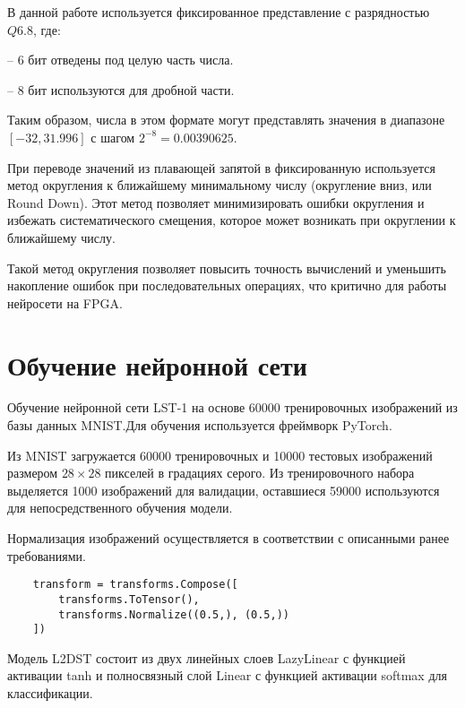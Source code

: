 В данной работе используется фиксированное представление с разрядностью $Q6.8$,
где:

  – 6 бит отведены под целую часть числа.

  – 8 бит используются для дробной части.

Таким образом, числа в этом формате могут представлять значения в диапазоне 
$[-32, 31.996]$ с шагом $2^{-8} = 0.00390625$.

При переводе значений из плавающей запятой в фиксированную используется метод 
округления к ближайшему минимальному числу (округление вниз, или Round Down). 
Этот метод позволяет минимизировать ошибки округления и избежать 
систематического смещения, которое может возникать при округлении к ближайшему 
числу.

Такой метод округления позволяет повысить точность вычислений и уменьшить 
накопление ошибок при последовательных операциях, что критично для работы 
нейросети на FPGA.\@

\section{Обучение нейронной сети}
\hspace*{12.5 mm}Обучение нейронной сети LST-1 на основе 60000 тренировочных 
изображений из базы данных MNIST.\@ Для обучения используется фреймворк 
PyTorch.

Из MNIST загружается 60000 тренировочных и 10000 тестовых изображений размером 
\(28 \times 28\) пикселей в градациях серого. Из тренировочного набора 
выделяется 1000 изображений для валидации, оставшиеся 59000 используются для 
непосредственного обучения модели. 

Нормализация изображений осуществляется в соответствии с описанными ранее 
требованиями.

\small
\fontsize{12pt}{12pt}\selectfont
\begin{verbatim}
    transform = transforms.Compose([
        transforms.ToTensor(),
        transforms.Normalize((0.5,), (0.5,))
    ])
\end{verbatim}
\normalsize
\fontsize{14pt}{14pt}\selectfont

Модель L2DST состоит из двух линейных слоев LazyLinear с функцией активации 
tanh и полносвязный слой Linear с функцией активации softmax для классификации. 

